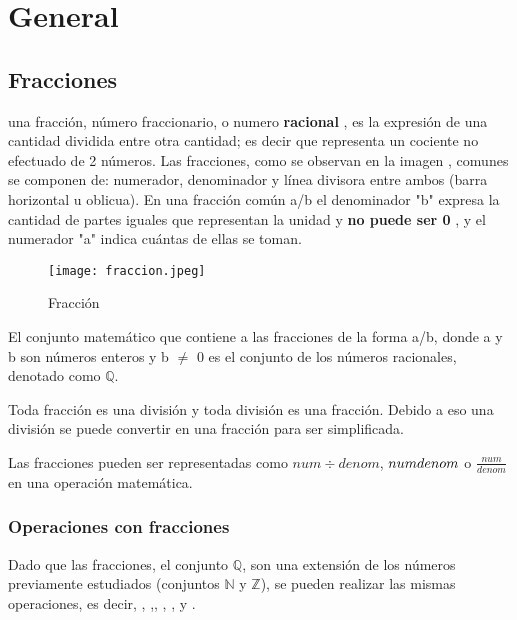 \section{General}



\subsection{Fracciones}

una fracción, número fraccionario, o numero \textbf{racional} ,
es la expresión de una cantidad dividida entre otra cantidad;
es decir que representa un cociente no efectuado de 2 números.
Las fracciones, como se observan en la imagen , comunes se componen de:
numerador, denominador y línea divisora
entre ambos (barra horizontal u oblicua). En una fracción común  a/b el
denominador "b" expresa la cantidad de partes iguales que
representan la unidad y \textbf{no puede ser 0} , y el numerador "a" indica
cuántas de ellas se toman.

    \begin{figure}[htb]
		\centering
        \caption{Fracción}
		\texttt{[image: fraccion.jpeg]}
		\label{Fracción}
	\end{figure}


El conjunto matemático que contiene a las fracciones de la forma a/b, donde a y
b son números enteros y b $\not =$ 0 es el conjunto de los números racionales, denotado
como $\mathbb{Q}$.

Toda fracción es una división y toda división es una fracción. Debido a eso una
división se puede convertir en una fracción para ser simplificada.

Las fracciones pueden ser representadas como $num\div denom$, $num\/denom$ o
$\frac{num}{denom}$  en una operación matemática.



\subsubsection{Operaciones con fracciones}

    Dado que las fracciones, el conjunto $\mathbb{Q}$,  son una extensión de
    los números previamente estudiados (conjuntos $\mathbb{N}$ y $\mathbb{Z}$),
    se pueden realizar las mismas operaciones, es decir, ,
    ,,
    , ,
     y .


